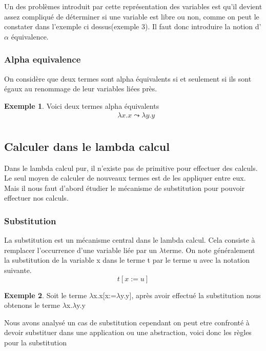 \documentclass {article}
\theoremstyle{definition}
\newtheorem{example}{Exemple}
\theoremstyle{remark}
\begin{document}
Un des problèmes introduit par cette représentation des variables est qu'il devient assez compliqué de déterminer si une variable est libre ou non, comme on peut le constater dans l'exemple ci dessus(exemple 3). Il faut donc introduire la notion d'\(\alpha\) équivalence.

\subsubsection{Alpha equivalence}
On considère que deux termes sont alpha équivalents si et seulement si ils sont 
égaux au renommage de leur variables liées près. 
\begin{example}
  Voici deux termes alpha équivalents 
  \begin{align*}
    & \lambda x.x \leadsto \lambda y.y \\
  \end{align*}
\end{example}
  
\subsection{Calculer dans le lambda calcul}

Dans le lambda calcul pur, il n'existe pas de primitive pour effectuer des 
calculs. Le seul moyen de calculer de nouveaux termes est de les appliquer 
entre eux. Mais il nous faut d'abord étudier le mécanisme de substitution pour 
pouvoir effectuer nos calculs.

\subsubsection{Substitution}

La substitution est un mécanisme central dans le lambda calcul. Cela consiste 
à remplacer l'occurrence d'une variable liée par un \(\lambda\)terme.
On note généralement la substitution de la variable x dans le terme t par le 
terme u avec la notation suivante. 
\[ 
t[x:=u]
\]

\begin{example}
  Soit le terme \(\lambda\)x.x[x:=\(\lambda\)y.y], après avoir effectué la
  substitution nous obtenons le terme \(\lambda\)x.\(\lambda\)y.y
\end{example}


Nous avons analysé un cas de substitution cependant on peut etre confronté 
à devoir substituer dans une application ou une abstraction, voici donc 
les règles pour la substitution 
\end{document}
